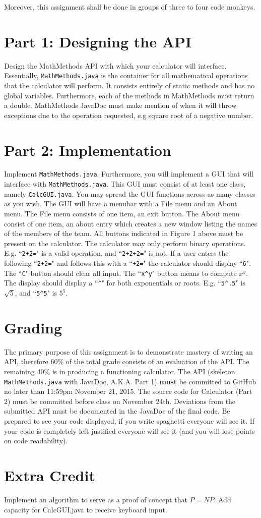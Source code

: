 \documentclass[]{simple}
\begin{document}
Moreover, this assignment shall be done in groups of three to four code monkeys.

\section{Part 1: Designing the API}
Design the MathMethods API with which your calculator will interface.
Essentially, \verb|MathMethods.java| is the container for all mathematical operations that the calculator will perform.
It consists entirely of static methods and has no global variables.
Furthermore, each of the methods in MathMethods must return a double.
MathMethods JavaDoc must make mention of when it will throw exceptions due to the operation requested, e.g square root of a negative number.

\section{Part 2: Implementation}
Implement \verb|MathMethods.java|.
Furthermore, you will implement a GUI that will interface with \verb|MathMethods.java|.
This GUI must consist of at least one class, namely \verb|CalcGUI.java|.
You may spread the GUI functions across as many classes as you wish.
The GUI will have a menubar with a File menu and an About menu.
The File menu consists of one item, an exit button.
The About menu consist of one item, an about entry which creates a new window listing the names of the members of the team.
All buttons indicated in Figure 1 above must be present on the calculator.
The calculator may only perform binary operations. 
E.g. ``\verb|2+2=|" is a valid operation, and ``\verb|2+2+2=|" is not.
If a user enters the following ``\verb|2+2=|" and follows this with a ``\verb|+2=|" the calculator should display ``\verb|6|".
The ``\verb|C|" button should clear all input.
The ``\verb|x^y|" button means to compute $x^y$.
The display should display a ``\verb|^|" for both exponentials or roots.
E.g. ``\verb|5^.5|" is $\sqrt{5}$, and ``\verb|5^5|" is $5^{5}$.

\section {Grading}
The primary purpose of this assignment is to demonstrate mastery of writing an API, therefore 60\% of the total grade consists of an evaluation of the API.
The remaining 40\% is in producing a functioning calculator.
The API (skeleton \verb|MathMethods.java| with JavaDoc, A.K.A. Part 1) \textbf{must} be committed to GitHub no later than 11:59pm November 21, 2015.
The source code for Calculator (Part 2) must be committed before class on November 24th.
Deviations from the submitted API must be documented in the JavaDoc of the final code.
Be prepared to see your code displayed, if you write spaghetti everyone will see it.
If your code is completely left justified everyone will see it (and you will lose points on code readability).

\section{Extra Credit}
Implement an algorithm to serve as a proof of concept that $P=NP$.
Add capacity for CalcGUI.java to receive keyboard input.
\end{document}
